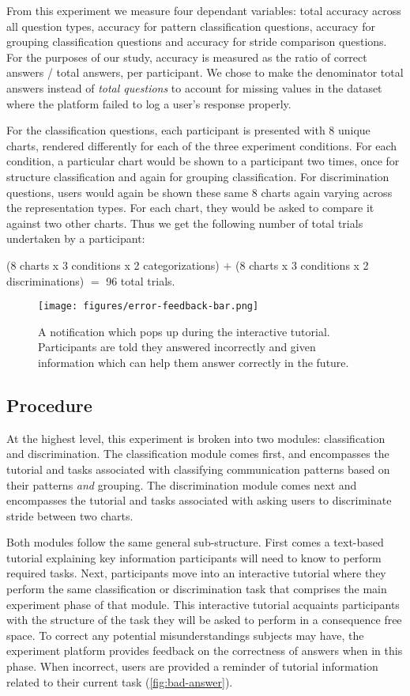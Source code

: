     From this experiment we measure four dependant variables: total accuracy across all question types, accuracy for pattern classification questions, accuracy for grouping classification questions and accuracy for stride comparison questions. For the purposes of our study, accuracy is measured as the ratio of correct answers / total answers, per participant. We chose to make the denominator total answers instead of \textit{total questions} to account for missing values in the dataset where the platform failed to log a user's response properly. 
    
    For the classification questions, each participant is presented with 8 unique charts, rendered differently for each of the three experiment conditions. For each condition, a particular chart would be shown to a participant two times, once for structure classification and again for grouping classification. For discrimination questions, users would again be shown these same 8 charts again varying across the representation types. For each chart, they would be asked to compare it against two other charts. Thus we get the following number of total trials undertaken by a participant:
    
    (8 charts x 3 conditions x 2 categorizations) $+$ (8 charts x 3 conditions x 2 discriminations) $=$ 96 total trials.
    

    \begin{figure}
        \centering
        \texttt{[image: figures/error-feedback-bar.png]}
        \caption{A notification which pops up during the interactive tutorial. Participants are told they answered incorrectly and given information which can help them answer correctly in the future.}
        \label{fig:bad-answer}
    \end{figure}
    

\subsection{Procedure}
    At the highest level, this experiment is broken into two modules: classification and discrimination. The classification module comes first, and encompasses the tutorial and tasks associated with classifying communication patterns based on their patterns \textit{and} grouping. The discrimination module comes next and encompasses the tutorial and tasks associated with asking users to discriminate stride between two charts.
    
    Both modules follow the same general sub-structure. First comes a text-based tutorial explaining key information participants will need to know to perform required tasks. Next, participants move into an interactive tutorial where they perform the same classification or discrimination task that comprises the main experiment phase of that module. This interactive tutorial acquaints participants with the structure of the task they will be asked to perform in a consequence free space. To correct any potential misunderstandings subjects may have, the experiment platform provides feedback on the correctness of answers when in this phase. When incorrect, users are provided a reminder of tutorial information related to their current task (\autoref{fig:bad-answer}).
    

